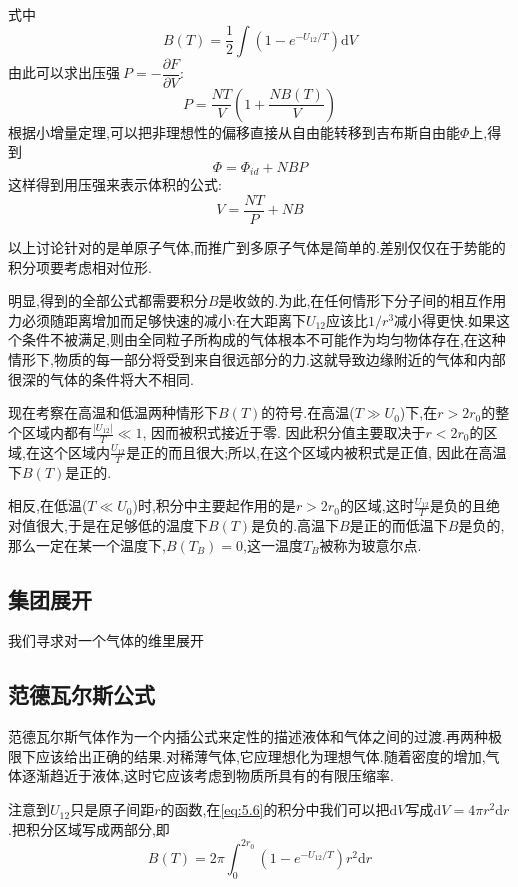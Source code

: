   式中 
  \begin{equation}
    B(T)=\frac{1}{2}\int(1-e^{-U_{12} / T})\mathrm{d} V \label{eq:5.6}
  \end{equation}
  由此可以求出压强$~P=-\dfrac{\partial F}{\partial V}$:
  \begin{equation}
    P=\dfrac{NT}{V}\left( 1+\dfrac{NB(T)}{V} \right) 
  \end{equation}
  根据小增量定理,可以把非理想性的偏移直接从自由能转移到吉布斯自由能$\Phi$上,得到 
  \[\Phi=\Phi_{id}+NBP\]
  这样得到用压强来表示体积的公式:
  \begin{equation}
    V=\dfrac{NT}{P}+NB 
  \end{equation}

  以上讨论针对的是单原子气体,而推广到多原子气体是简单的.差别仅仅在于势能的积分项要考虑相对位形.

  明显,得到的全部公式都需要积分$B$是收敛的.为此,在任何情形下分子间的相互作用力必须随距离增加而足够快速的减小:在大距离下$U_{12}$应该比$1 / r^{3}$减小得更快.如果这个条件不被满足,则由全同粒子所构成的气体根本不可能作为均匀物体存在,在这种情形下,物质的每一部分将受到来自很远部分的力.这就导致边缘附近的气体和内部很深的气体的条件将大不相同.

  现在考察在高温和低温两种情形下$B(T)$的符号.在高温($T\gg U_0$)下,在$r>2r_{0}$的整个区域内都有$\frac{\left\vert U_{12} \right\vert}{T}\ll 1$, 因而被积式接近于零. 因此积分值主要取决于$r<2r_0$的区域,在这个区域内$\frac{U_{12}}{T}$是正的而且很大;所以,在这个区域内被积式是正值, 因此在高温下$B(T)$是正的.

  相反,在低温($T\ll U_0$)时,积分中主要起作用的是$r>2r_0$的区域,这时$ \frac{U_{12}}{T}$是负的且绝对值很大,于是在足够低的温度下$B(T)$是负的.高温下$B$是正的而低温下$B$是负的, 那么一定在某一个温度下,$B(T_B)=0$,这一温度$T_B$被称为玻意尔点.

\subsection{集团展开}
  我们寻求对一个气体的维里展开


\subsection{范德瓦尔斯公式}
  范德瓦尔斯气体作为一个内插公式来定性的描述液体和气体之间的过渡.再两种极限下应该给出正确的结果.对稀薄气体,它应理想化为理想气体.随着密度的增加,气体逐渐趋近于液体,这时它应该考虑到物质所具有的有限压缩率.

  注意到$U_{12}$只是原子间距$r$的函数,在\eqref{eq:5.6}的积分中我们可以把$\mathrm{d} V$写成$\mathrm{d}  V= 4\pi r^{2}\mathrm{d} r$.把积分区域写成两部分,即
  \[B(T)=2\pi \int_{0}^{2r_0}(1-e^{-U_{12} / T})r^{2}\mathrm{d} r\]
  
